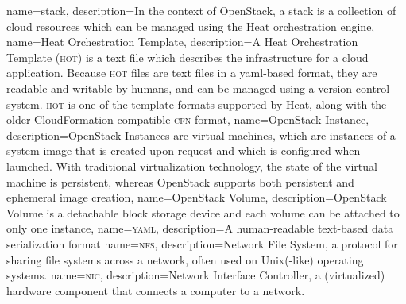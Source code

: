 {
  name={stack},
  description={In the context of \gls{OpenStack}, a stack is a
  collection of cloud resources which can be managed using the
  \gls{Heat} orchestration engine},
}
{
  name={Heat Orchestration Template},
  description={A \gls{Heat} Orchestration Template (\textsc{hot}) is a text
  file which describes the infrastructure for a cloud application.
  Because \textsc{hot} files are text files in a \gls{yaml}-based format, they
  are readable and writable by humans, and can be managed using a
  version control system.  \textsc{hot} is one of the template formats
  supported by Heat, along with the older CloudFormation-compatible
  \textsc{cfn} format},
}
{
  name={OpenStack Instance},
  description={OpenStack Instances are virtual machines, which are
  instances of a system image that is created upon request and which
  is configured when launched. With traditional virtualization
  technology, the state of the virtual machine is persistent, whereas
  OpenStack supports both persistent and ephemeral image creation},
}
{
  name={OpenStack Volume},
  description={OpenStack Volume is a detachable block storage device
  and each volume can be attached to only one instance},
}
{
  name={\textsc{yaml}},
  description={A human-readable text-based data serialization
  format}
}
{
  name={\textsc{nfs}},
  description={Network File System, a protocol for sharing file
    systems across a network, often used on Unix(-like) operating
    systems.}
}
{
  name={\textsc{nic}},
  description={Network Interface Controller, a (virtualized)
    hardware component that connects a computer to a network.}
}
